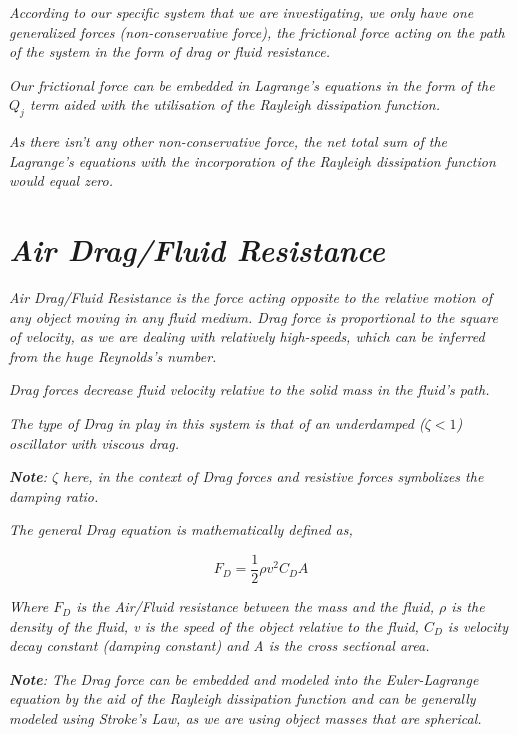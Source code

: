    \textit{According to our specific system that we are investigating, we only have one generalized forces (non-conservative force), the frictional force acting on the path of the system in the form of drag or fluid resistance.}
        
    \textit{Our frictional force can be embedded in Lagrange's equations in the form of the $Q_j$ term aided with the utilisation of the Rayleigh dissipation function.}
        
    \textit{As there isn't any other non-conservative force, the net total sum of the Lagrange's equations with the incorporation of the Rayleigh dissipation function would equal zero.}
        
\section{\textit{Air Drag/Fluid Resistance}}
        
    \textit{Air Drag/Fluid Resistance is the force acting opposite to the relative motion of any object moving in any fluid medium. Drag force is proportional to the square of velocity, as we are dealing with relatively high-speeds, which can be inferred from the huge Reynolds's number.}
            
    \textit{Drag forces decrease fluid velocity relative to the solid mass in the fluid's path.}
            
    \textit{The type of Drag in play in this system is that of an underdamped ($\zeta < 1$) oscillator with viscous drag.}
            
    \textit{\textbf{Note}: $\zeta$ here, in the context of Drag forces and resistive forces symbolizes the damping ratio.}
            
    \textit{The general Drag equation is mathematically defined as,}
            
        $$F_D = \frac{1}{2}\rho v^2C_DA$$
           
    \textit{Where $F_D$ is the Air/Fluid resistance between the mass and the fluid, $\rho$ is the density of the fluid, v is the speed of the object relative to the fluid, $C_D$ is velocity decay constant (damping constant) and A is the cross sectional area.}
            
    \textit{\textbf{Note}: The Drag force can be embedded and modeled into the Euler-Lagrange equation by the aid of the Rayleigh dissipation function and can be generally modeled using Stroke's Law, as we are using object masses that are spherical.}
            
